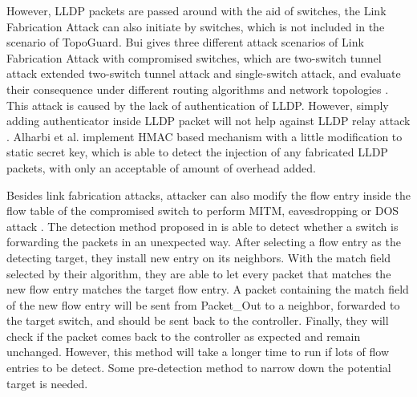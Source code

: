 However, LLDP packets are passed around with the aid of switches, the Link Fabrication Attack can also initiate by switches, which is not included in the scenario of TopoGuard. Bui gives three different attack scenarios of Link Fabrication Attack with compromised switches, which are two-switch tunnel attack extended two-switch tunnel attack and single-switch attack, and evaluate their consequence under different routing algorithms and network topologies \cite{TTB15}. This attack is caused by the lack of authentication of LLDP. However, simply adding authenticator inside LLDP packet will not help against LLDP relay attack \cite{HXWG15}. Alharbi et al. implement HMAC based mechanism with a little modification to static secret key, which is able to detect the injection of any fabricated LLDP packets, with only an acceptable of amount of overhead added.
\cite{ATPP15}

Besides link fabrication attacks, attacker can also modify the flow entry inside the flow table of the compromised switch to perform MITM, eavesdropping or DOS attack \cite{AAS14}. The detection method proposed in \cite{CKGL15} is able to detect whether a switch is forwarding the packets in an unexpected way. After selecting a flow entry as the detecting target, they install new entry on its neighbors. With the match field selected by their algorithm, they are able to let every packet that matches the new flow entry matches the target flow entry. A packet containing the match field of the new flow entry will be sent from Packet\_Out to a neighbor, forwarded to the target switch, and should be sent back to the controller. Finally, they will check if the packet comes back to the controller as expected and remain unchanged. However, this method will take a longer time to run if lots of flow entries to be detect. Some pre-detection method to narrow down the potential target is needed.
